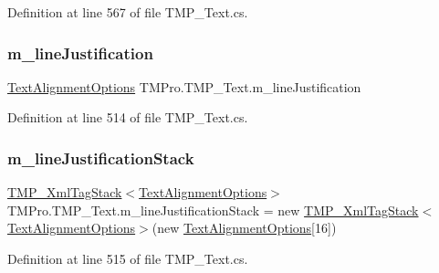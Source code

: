 Definition at line 567 of file T\+M\+P\+\_\+\+Text.\+cs.

\mbox{\label{class_t_m_pro_1_1_t_m_p___text_af457c6c84c55f47a3b2b3db469921830}} 
\subsubsection{\texorpdfstring{m\_lineJustification}{m\_lineJustification}}
{\footnotesize\ttfamily \mbox{\hyperlink{namespace_t_m_pro_a1dd743b58b1fd4057c00e4b98ab86301}{Text\+Alignment\+Options}} T\+M\+Pro.\+T\+M\+P\+\_\+\+Text.\+m\+\_\+line\+Justification\hspace{0.3cm}{\ttfamily [protected]}}



Definition at line 514 of file T\+M\+P\+\_\+\+Text.\+cs.

\mbox{\label{class_t_m_pro_1_1_t_m_p___text_acd021703ea5ea92b47512c2bfa86dec4}} 
\subsubsection{\texorpdfstring{m\_lineJustificationStack}{m\_lineJustificationStack}}
{\footnotesize\ttfamily \mbox{\hyperlink{struct_t_m_pro_1_1_t_m_p___xml_tag_stack}{T\+M\+P\+\_\+\+Xml\+Tag\+Stack}}$<$\mbox{\hyperlink{namespace_t_m_pro_a1dd743b58b1fd4057c00e4b98ab86301}{Text\+Alignment\+Options}}$>$ T\+M\+Pro.\+T\+M\+P\+\_\+\+Text.\+m\+\_\+line\+Justification\+Stack = new \mbox{\hyperlink{struct_t_m_pro_1_1_t_m_p___xml_tag_stack}{T\+M\+P\+\_\+\+Xml\+Tag\+Stack}}$<$\mbox{\hyperlink{namespace_t_m_pro_a1dd743b58b1fd4057c00e4b98ab86301}{Text\+Alignment\+Options}}$>$(new \mbox{\hyperlink{namespace_t_m_pro_a1dd743b58b1fd4057c00e4b98ab86301}{Text\+Alignment\+Options}}\mbox{[}16\mbox{]})\hspace{0.3cm}{\ttfamily [protected]}}



Definition at line 515 of file T\+M\+P\+\_\+\+Text.\+cs.

\mbox{\label{class_t_m_pro_1_1_t_m_p___text_a2dcc8f5189de1abcbc948e8f576e8801}} 
